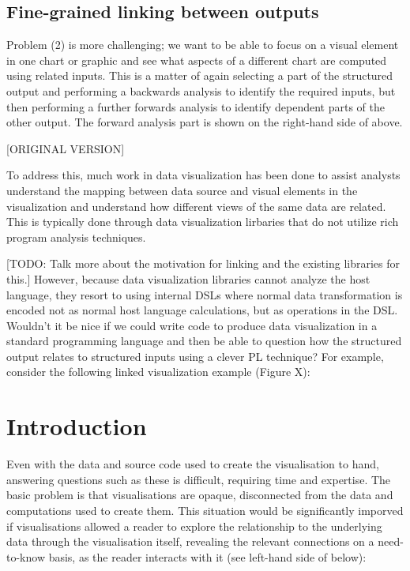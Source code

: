 \subsection{Fine-grained linking between outputs}

Problem (2) is more challenging; we want to be able to focus on a visual element in one chart or graphic and see what aspects of a different chart are computed using related inputs. This is a matter of again selecting a part of the structured output and performing a backwards analysis to identify the required inputs, but then performing a further forwards analysis to identify dependent parts of the other output. The forward analysis part is shown on the right-hand side of  above.

[ORIGINAL VERSION]

To address this, much work in data visualization has been done to assist analysts understand the mapping between data source and visual elements in the visualization and understand how different views of the same data are related. This is typically done through data visualization lirbaries that do not utilize rich program analysis techniques.

[TODO: Talk more about the motivation for linking and the existing libraries for this.]
However, because data visualization libraries cannot analyze the host language, they resort to using internal DSLs where normal data transformation is encoded not as normal host language calculations, but as operations in the DSL. Wouldn't it be nice if we could write code to produce data visualization in a standard programming language and then be able to question how the structured output relates to structured inputs using a clever PL technique? For example, consider the following linked visualization example (Figure X):

\section{Introduction}

\noindent Even with the data and source code used to create the visualisation to hand, answering questions such as these is difficult, requiring time and expertise. The basic problem is that visualisations are opaque, disconnected from the data and computations used to create them. This situation would be significantly imporved if visualisations allowed a reader to explore the relationship to the underlying data through the visualisation itself, revealing the relevant connections on a need-to-know basis, as the reader interacts with it (see left-hand side of  below):

